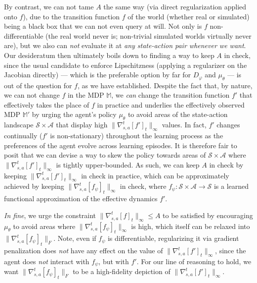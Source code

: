 By contrast, we can not tame $A$ the same way (via direct regularization applied onto $f$),
due to the transition function $f$ of the world (whether real or simulated)
being a black box that we can not even query at will.
Not only is $f$ non-differentiable (the real world never is; non-trivial simulated worlds virtually never are),
but we also can \emph{not} evaluate it at \textit{any state-action pair whenever we want}.
Our desideratum then ultimately boils down to finding a way to keep $A$ in check,
since the usual candidate to enforce Lipschitzness (applying a regularizer on the Jacobian directly) ---
which is the preferable option by far for $D_\varphi$ and $\mu_\theta$ ---
is out of the question for $f$, as we have established.
Despite the fact that, by nature, we can not change $f$ in the MDP $\mathbb{M}$,
we \emph{can} change the transition function $f'$ that
effectively takes the place of $f$ in practice
and underlies the effectively observed MDP $\mathbb{M}'$ by urging the agent's policy $\mu_\theta$ to avoid
areas of the state-action landscape $\mathcal{S} \times \mathcal{A}$
that display high $\lVert\nabla_{s,a}^t[f']_t\rVert _\infty$ values.
In fact, $f'$ changes continually ($f'$ is non-stationary)
throughout the learning process as the preferences of the agent
evolve across learning episodes.
It is therefore fair to posit that we can devise a way to skew the policy towards areas
of $\mathcal{S} \times \mathcal{A}$ where
$\lVert\nabla_{s,a}^t[f']_t\rVert _\infty$ is tightly upper-bounded.
As such, we can keep $A$ in check by keeping $\lVert\nabla_{s,a}^t[f']_t\rVert _\infty$ in check in practice,
which can be approximately achieved by keeping $\lVert\nabla_{s,a}^t[f_\psi]_t\rVert _\infty$ in check,
where $f_\psi : \mathcal{S} \times \mathcal{A} \to \mathcal{S}$
is a learned functional approximation of the effective dynamics $f'$.

\textit{In fine},
we urge the constraint $\lVert\nabla_{s,a}^t[f]_t\rVert _\infty \leq A$ to be satisfied
by encouraging $\mu_\theta$ to avoid areas where $\lVert\nabla_{s,a}^t[f_\psi]_t\rVert _\infty$
is high, which itself can be relaxed into $\lVert\nabla_{s,a}^t[f_\psi]_t\rVert _F$.
Note, even if $f_\psi$ is differentiable, regularizing it via gradient penalization does \emph{not}
have any effect on the value of $\lVert\nabla_{s,a}^t[f']_t\rVert _\infty$,
since the agent does \emph{not} interact with $f_\psi$, but with $f'$.
For our line of reasoning to hold, we want $\lVert\nabla_{s,a}^t[f_\psi]_t\rVert _F$ to be
a high-fidelity depiction of $\lVert\nabla_{s,a}^t[f']_t\rVert _\infty$.


